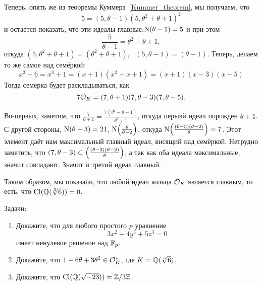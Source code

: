 \begin{example}
 	    Теперь, опять же из теооремы Куммера~\ref{Kummer_theorem}, мы получаем, что 
 	    \[
 	     	5 = (5, \theta - 1)(5, \theta^2 + \theta + 1)^2
 	     \] 
 	     и остается показать, что эти идеалы главные.$\Nm(\theta - 1) = 5$ и при этом 
 	     \[
 	     	\frac{5}{\theta - 1} = \theta^2 + \theta + 1, 
 	     \]
 	     откуда $(5, \theta^2 + \theta + 1) = (\theta^2 + \theta + 1)$, \ $(5, \theta - 1) = (\theta - 1)$.  Теперь, делаем то же самое над семёркой: 
 	     \[
 	     	x^3 - 6 = x^3 + 1 = (x + 1)(x^2 - x + 1) = (x + 1)(x - 3)(x - 5)
 	     \]
 	     Тогда семёрка будет раскладываться, как 
 	     \[
 	     	7\cO_{K} = (7, \theta + 1) (7, \theta - 3)(7, \theta - 5).
 	     \]

 	     Во-первых, заметим, что $\frac{7}{\theta + 1} = \frac{7(\theta^2 - \theta + 1)}{\theta^3 + 1}$, откуда перывй идеал порожден $\theta + 1$. С другой стороны, $\Nm(\theta - 3) = 21$, $\Nm\lr*{\frac{\theta}{\theta - 2}}$, откуда $\Nm\lr*{\frac{(\theta - 3)(\theta - 2)}{\theta}} = 7$. Этот элемент даёт нам максимальный главный идеал, висящий над семёркой. Нетрудно заметить, что $(7, \theta - 3) \subset \lr*{\frac{(\theta - 3)(\theta - 2)}{\theta}}$, а так как оба идеала максимальные, значит совпадают. Значит и третий идеал главный. 

 	     Таким образом, мы показали, что любой идеал кольца $\cO_{K}$ является главным, то есть, что $\Cl(\Q(\sqrt[3]{6})) = 0$.
 	  \end{example}

 	  \begin{homework}
 	  	Задачи: 
 	  	\begin{enumerate}
 	  		\item Докажите, что для любого простого $p$ уравнение  
 	  		\[
 	  			3x^2 + 4y^3 + 5z^3 = 0
 	  		\]
 	  		имеет ненулевое решение над $\F_{p}$.
 	  		\item Докажите, что $1 - 6\theta + 3\theta^2 \in \cO_{K}^{*}$, где $K = \Q(\sqrt[3]{6})$.

 	  		\item Докажите, что $\Cl(\Q(\sqrt{-23})) = \Z/3\Z$.
 	  	\end{enumerate}
 	  \end{homework}












